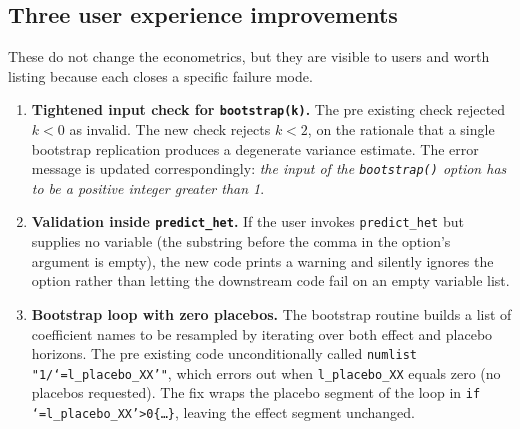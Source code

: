 \subsection*{Three user experience improvements}

These do not change the econometrics, but they are visible to users and worth listing because each closes a specific failure mode.

\begin{enumerate}
\item \textbf{Tightened input check for \texttt{bootstrap(k)}.} The pre existing check rejected $k < 0$ as invalid. The new check rejects $k < 2$, on the rationale that a single bootstrap replication produces a degenerate variance estimate. The error message is updated correspondingly: \textit{the input of the \texttt{bootstrap()} option has to be a positive integer greater than 1}.

\item \textbf{Validation inside \texttt{predict\_het}.} If the user invokes \texttt{predict\_het} but supplies no variable (the substring before the comma in the option's argument is empty), the new code prints a warning and silently ignores the option rather than letting the downstream code fail on an empty variable list.

\item \textbf{Bootstrap loop with zero placebos.} The bootstrap routine builds a list of coefficient names to be resampled by iterating over both effect and placebo horizons. The pre existing code unconditionally called \texttt{numlist "1/`=l\_placebo\_XX'"}, which errors out when \texttt{l\_placebo\_XX} equals zero (no placebos requested). The fix wraps the placebo segment of the loop in \texttt{if `=l\_placebo\_XX'>0\{\ldots\}}, leaving the effect segment unchanged.


\end{enumerate}


